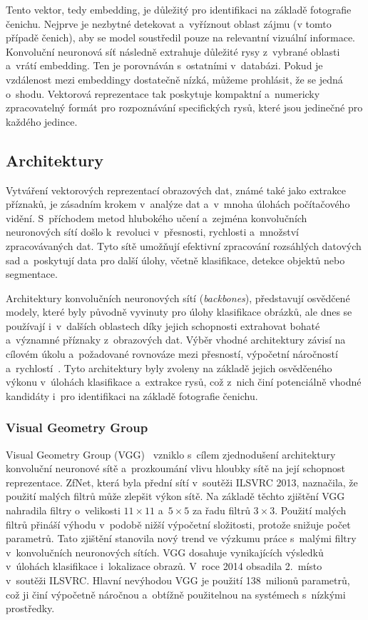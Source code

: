 Tento vektor, tedy embedding, je důležitý pro identifikaci na základě fotografie čenichu. Nejprve je nezbytné detekovat a~vyříznout oblast zájmu (v tomto případě čenich), aby se model soustředil pouze na relevantní vizuální informace. Konvoluční neuronová síť následně extrahuje důležité rysy z~vybrané oblasti a~vrátí embedding. Ten je porovnáván s~ostatními v~databázi. Pokud je vzdálenost mezi embeddingy dostatečně nízká, můžeme prohlásit, že se jedná o~shodu. Vektorová reprezentace tak poskytuje kompaktní a~numericky zpracovatelný formát pro rozpoznávání specifických rysů, které jsou jedinečné pro každého jedince.

\subsection*{Architektury}
Vytváření vektorových reprezentací obrazových dat, známé také jako extrakce příznaků, je zásadním krokem v~analýze dat a~v~mnoha úlohách počítačového vidění. S~příchodem metod hlubokého učení a~zejména konvolučních neuronových sítí došlo k~revoluci v~přesnosti, rychlosti a~množství zpracovávaných dat. Tyto sítě umožňují efektivní zpracování rozsáhlých datových sad a~poskytují data pro další úlohy, včetně klasifikace, detekce objektů nebo segmentace.

Architektury konvolučních neuronových sítí (\textit{backbones}), představují osvědčené modely, které byly původně vyvinuty pro úlohy klasifikace obrázků, ale dnes se používají i~v~dalších oblastech díky jejich schopnosti extrahovat bohaté a~významné příznaky z~obrazových dat. Výběr vhodné architektury závisí na cílovém úkolu a~požadované rovnováze mezi přesností, výpočetní náročností a~rychlostí~\cite{backbones}.
Tyto architektury byly zvoleny na základě jejich osvědčeného výkonu v~úlohách klasifikace a~extrakce rysů, což z~nich činí potenciálně vhodné kandidáty i~pro identifikaci na základě fotografie čenichu.

\subsubsection*{Visual Geometry Group}
Visual Geometry Group (VGG)~\cite{deepCNN} vzniklo s~cílem zjednodušení architektury konvoluční neuronové sítě a~prozkoumání vlivu hloubky sítě na její schopnost reprezentace. ZfNet, která byla přední sítí v~soutěži ILSVRC 2013, naznačila, že použití malých filtrů může zlepšit výkon sítě. Na základě těchto zjištění VGG nahradila filtry o~velikosti \(11 \times 11\) a~\(5 \times 5\) za řadu filtrů \(3 \times 3\). Použití malých filtrů přináší výhodu v~podobě nižší výpočetní složitosti, protože snižuje počet parametrů. Tato zjištění stanovila nový trend ve výzkumu práce s~malými filtry v~konvolučních neuronových sítích. VGG dosahuje vynikajících výsledků v~úlohách klasifikace i~lokalizace obrazů. V~roce 2014 obsadila 2.~místo v~soutěži ILSVRC. Hlavní nevýhodou VGG je použití 138~milionů parametrů, což ji činí výpočetně náročnou a~obtížně použitelnou na systémech s~nízkými prostředky.

